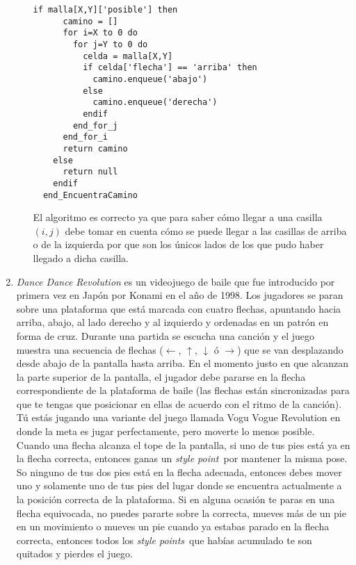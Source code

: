 \documentclass[11pt,letterpaper]{article}
\begin{document}
\begin{enumerate}[leftmargin=*]
\begin{enumerate}[label=\roman*)]
\begin{lstlisting}[caption=Encontrar camino en matriz de $X\times Y$]
    if malla[X,Y]['posible'] then
      camino = []
      for i=X to 0 do
        for j=Y to 0 do
          celda = malla[X,Y]
          if celda['flecha'] == 'arriba' then
            camino.enqueue('abajo')
          else
            camino.enqueue('derecha')
          endif
        end_for_j
      end_for_i
      return camino
    else
      return null
    endif
  end_EncuentraCamino
      \end{lstlisting}
      
      El algoritmo es correcto ya que para saber cómo llegar a una casilla $(i,j)$ debe tomar en cuenta cómo se puede llegar a las casillas de arriba o de la izquierda por que son los únicos lados de los que pudo haber llegado a dicha casilla.
    \end{enumerate}
    
    \newcommand\stylePoint{\textit{style point}}
    \newcommand\stylePoints{\textit{style points}}
    \item \textit{Dance Dance Revolution} es un videojuego de baile que fue introducido por primera vez en Japón por Konami en el año de 1998. Los jugadores se paran sobre una plataforma que está marcada con cuatro flechas, apuntando hacia arriba, abajo, al lado derecho y al izquierdo y ordenadas en un patrón en forma de cruz. Durante una partida se escucha una canción y el juego muestra una secuencia de flechas ($\leftarrow$, $\uparrow$, $\downarrow$ ó $\rightarrow$) que se van desplazando desde abajo de la pantalla hasta arriba. En el momento justo en que alcanzan la parte superior de la pantalla, el jugador debe pararse en la flecha correspondiente de la plataforma de baile (las flechas están sincronizadas para que te tengas que posicionar en ellas de acuerdo con el ritmo de la canción). Tú estás jugando una variante del juego llamada Vogu Vogue Revolution en donde la meta es jugar perfectamente, pero moverte lo menos posible. Cuando una flecha alcanza el tope de la pantalla, si uno de tus pies está ya en la flecha correcta, entonces ganas un \stylePoint\ por mantener la misma pose. So ninguno de tus dos pies está en la flecha adecuada, entonces debes mover uno y solamente uno de tus pies del lugar donde se encuentra actualmente a la posición correcta de la plataforma. Si en alguna ocasión te paras en una flecha equivocada, no puedes pararte sobre la correcta, mueves más de un pie en un movimiento o mueves un pie cuando ya estabas parado en la flecha correcta, entonces todos los \stylePoints\ que habías acumulado te son quitados y pierdes el juego.
    

\end{enumerate}
\end{document}
